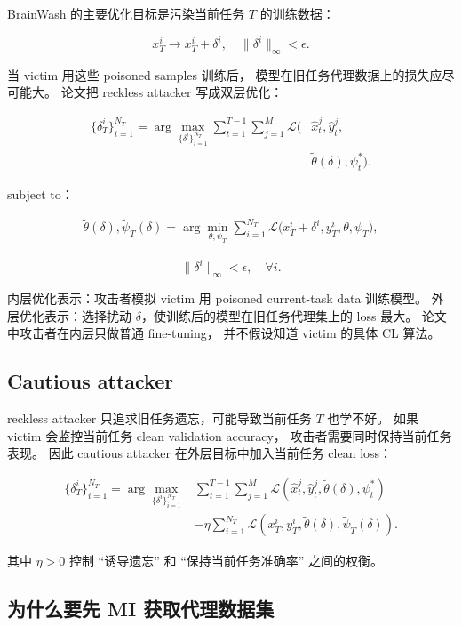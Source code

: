 \documentclass[11pt]{article}
\begin{document}
BrainWash 的主要优化目标是污染当前任务 \(T\) 的训练数据：

\[
x_T^i
\longrightarrow
x_T^i+\delta^i,
\quad
\|\delta^i\|_{\infty}<\epsilon.
\]

当 victim 用这些 poisoned samples 训练后，
模型在旧任务代理数据上的损失应尽可能大。
论文把 reckless attacker 写成双层优化：

\[
\begin{aligned}
\{\delta_T^i\}_{i=1}^{N_T}
=
\arg\max_{\{\delta^i\}_{i=1}^{N_T}}
\sum_{t=1}^{T-1}
\sum_{j=1}^{M}
\mathcal{L}
\bigl(
&\hat{x}_t^j,\hat{y}_t^j, \\
&\tilde{\theta}(\delta),\psi_t^{*}
\bigr).
\end{aligned}
\]

subject to：

\[
\begin{aligned}
\tilde{\theta}(\delta),\tilde{\psi}_T(\delta)
=
\arg\min_{\theta,\psi_T}
\sum_{i=1}^{N_T}
\mathcal{L}
\bigl(
x_T^i+\delta^i,y_T^i,\theta,\psi_T
\bigr),
\end{aligned}
\]

\[
\|\delta^i\|_{\infty}<\epsilon,
\quad
\forall i.
\]

内层优化表示：攻击者模拟 victim 用 poisoned current-task data 训练模型。
外层优化表示：选择扰动 \(\delta\)，使训练后的模型在旧任务代理集上的 loss 最大。
论文中攻击者在内层只做普通 fine-tuning，
并不假设知道 victim 的具体 CL 算法。

\subsection{Cautious attacker}

reckless attacker 只追求旧任务遗忘，可能导致当前任务 \(T\) 也学不好。
如果 victim 会监控当前任务 clean validation accuracy，
攻击者需要同时保持当前任务表现。
因此 cautious attacker 在外层目标中加入当前任务 clean loss：

\[
\begin{aligned}
\{\delta_T^i\}_{i=1}^{N_T}
=
\arg\max_{\{\delta^i\}_{i=1}^{N_T}}
&
\sum_{t=1}^{T-1}
\sum_{j=1}^{M}
\mathcal{L}
(\hat{x}_t^j,\hat{y}_t^j,\tilde{\theta}(\delta),\psi_t^{*}) \\
&-
\eta
\sum_{i=1}^{N_T}
\mathcal{L}
(x_T^i,y_T^i,\tilde{\theta}(\delta),\tilde{\psi}_T(\delta)).
\end{aligned}
\]

其中 \(\eta>0\) 控制 ``诱导遗忘'' 和 ``保持当前任务准确率'' 之间的权衡。

\subsection{为什么要先 MI 获取代理数据集}
\end{document}
